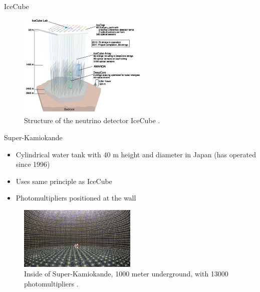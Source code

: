 \documentclass[aspectratio=1610, 10pt]{beamer}
\begin{document}
\begin{frame}{IceCube}
  \begin{figure}
    \includegraphics[width=0.55\textwidth]{images/icecube.png}
    \caption{Structure of the neutrino detector IceCube \cite{neutrino}.}
  \end{figure}
\end{frame}


\begin{frame}{Super-Kamiokande}
  \begin{itemize}
    \item Cylindrical water tank with 40 m height and diameter in Japan (has operated since 1996)
    \medskip
    \item Uses same principle as IceCube
    \medskip
    \item Photomultipliers positioned at the wall
  \end{itemize}
  \begin{figure}
    \includegraphics[width=0.5\textwidth]{images/kamiokande.png}
    \caption{Inside of Super-Kamiokande, 1000 meter underground, with 13000 photomultipliers \cite{kamio}.}
  \end{figure}
\end{frame}
\end{document}
